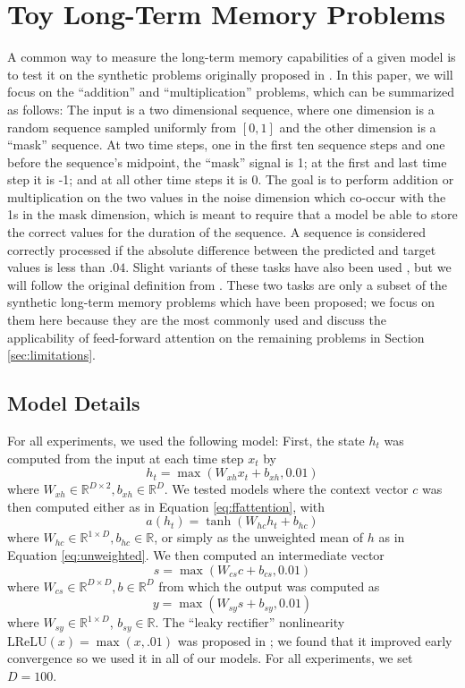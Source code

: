 \documentclass{article} %
\begin{document}
\section{Toy Long-Term Memory Problems}

A common way to measure the long-term memory capabilities of a given model is to test it on the synthetic problems originally proposed in \cite{hochreiter1997long}.
In this paper, we will focus on the ``addition'' and ``multiplication'' problems, which can be summarized as follows:
The input is a two dimensional sequence, where one dimension is a random sequence sampled uniformly from $[0, 1]$ and the other dimension is a ``mask'' sequence.
At two time steps, one in the first ten sequence steps and one before the sequence's midpoint, the ``mask'' signal is 1; at the first and last time step it is -1; and at all other time steps it is 0.
The goal is to perform addition or multiplication on the two values in the noise dimension which co-occur with the 1s in the mask dimension, which is meant to require that a model be able to store the correct values for the duration of the sequence.
A sequence is considered correctly processed if the absolute difference between the predicted and target values is less than $.04$.
Slight variants of these tasks have also been used \cite{sutskever2013importance,le2015simple,jaegar2012long,martens2011learning}, but we will follow the original definition from \cite{hochreiter1997long}.
These two tasks are only a subset of the synthetic long-term memory problems which have been proposed; we focus on them here because they are the most commonly used and discuss the applicability of feed-forward attention on the remaining problems in Section \ref{sec:limitations}.

\subsection{Model Details}

For all experiments, we used the following model:
First, the state $h_t$ was computed from the input at each time step $x_t$ by 
$$
h_t = \max(W_{xh}x_t + b_{xh}, 0.01)
$$
where $W_{xh} \in \mathbb{R}^{D \times 2}, b_{xh} \in \mathbb{R}^D$.
We tested models where the context vector $c$ was then computed either as in Equation \ref{eq:ffattention}, with 
$$
a(h_t) =\tanh(W_{hc}h_t + b_{hc})
$$
where $W_{hc} \in \mathbb{R}^{1 \times D}, b_{hc} \in \mathbb{R}$, or simply as the unweighted mean of $h$ as in Equation \ref{eq:unweighted}.
We then computed an intermediate vector 
$$
s = \max(W_{cs}c + b_{cs}, 0.01)
$$
where $W_{cs} \in \mathbb{R}^{D \times D}, b \in \mathbb{R}^D$ from which the output was computed as
$$
y = \max(W_{sy}s + b_{sy}, 0.01)
$$
where $W_{sy} \in \mathbb{R}^{1 \times D}$, $b_{sy} \in \mathbb{R}$.
The ``leaky rectifier'' nonlinearity $\textrm{LReLU}(x) = \max(x, .01)$ was proposed in \cite{maas2013rectifier}; we found that it improved early convergence so we used it in all of our models.
For all experiments, we set $D = 100$.
\end{document}
